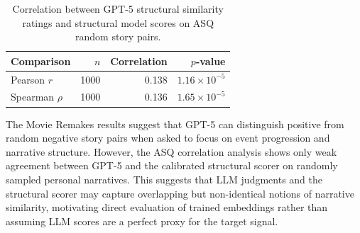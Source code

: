 \begin{table}[t]
\centering
\small
\begin{tabular}{lrrr}
\toprule
Comparison & $n$ & Correlation & $p$-value \\
\midrule
Pearson $r$ & 1000 & 0.138 & $1.16\times10^{-5}$ \\
Spearman $\rho$ & 1000 & 0.136 & $1.65\times10^{-5}$ \\
\bottomrule
\end{tabular}
\caption{Correlation between GPT-5 structural similarity ratings and structural model scores on ASQ random story pairs.}
\label{tab:asq-llm-correlation}
\end{table}

The Movie Remakes results suggest that GPT-5 can distinguish positive from random negative story pairs when asked to focus on event progression and narrative structure. However, the ASQ correlation analysis shows only weak agreement between GPT-5 and the calibrated structural scorer on randomly sampled personal narratives. This suggests that LLM judgments and the structural scorer may capture overlapping but non-identical notions of narrative similarity, motivating direct evaluation of trained embeddings rather than assuming LLM scores are a perfect proxy for the target signal.
